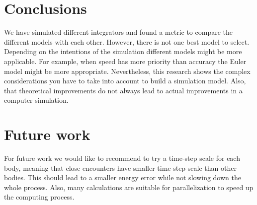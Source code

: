 \documentclass[11pt]{article} %
\begin{document}
\section{Conclusions}
\label{sec:conclusion}
We have simulated different integrators and found a metric to compare the different models with each other. However, there is not one best model to select. Depending on the intentions of the simulation different models might be more applicable. For example, when speed has more priority than accuracy the Euler model might be more appropriate. Nevertheless, this research shows the complex considerations you have to take into account to build a simulation model. Also, that theoretical improvements do not always lead to actual improvements in a computer simulation. 

\section{Future work}
For future work we would like to recommend to try a time-step scale for each body, meaning that close encounters have smaller time-step scale than other bodies. This should lead to a smaller energy error while not slowing down the whole process. Also, many calculations are suitable for parallelization to speed up the computing process. 





\end{document}
